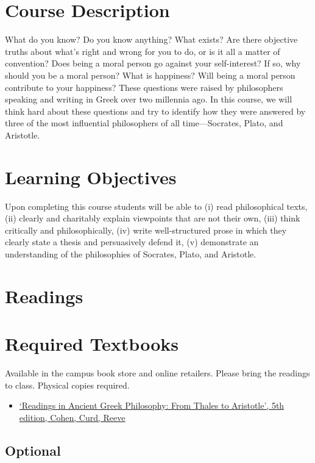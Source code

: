 \documentclass[article,oneside]{memoir}
\begin{document}
\section{Course Description}

What do you know? Do you know anything? What exists? Are there objective truths about what’s right and wrong for you to do, or is it all a matter of convention? Does being a moral person go against your self-interest? If so, why should you be a moral person? What is happiness? Will being a moral person contribute to your happiness? These questions were raised by philosophers speaking and writing in Greek over two millennia ago. In this course, we will think hard about these questions and try to identify how they were answered by three of the most influential philosophers of all time---Socrates, Plato, and Aristotle. 

\section{Learning Objectives}

Upon completing this course students will be able to (i) read philosophical texts, (ii) clearly and charitably explain viewpoints that
are not their own, (iii) think critically and philosophically, (iv) write well-structured prose in which they clearly state a thesis and persuasively defend it, (v) demonstrate an understanding of the philosophies of Socrates, Plato, and Aristotle.


\section{Readings}
\section{Required Textbooks}

Available in the campus book store and online retailers. Please bring the readings to class. Physical copies required.
\begin{itemize}
\item \href{https://www.amazon.com/Readings-Ancient-Greek-Philosophy-Aristotle/dp/1624665322/ref=dp_ob_title_bk}{`Readings in Ancient Greek Philosophy: From Thales to Aristotle', 5th edition, Cohen, Curd, Reeve}


\end{itemize}
\subsection{Optional}
\end{document}
